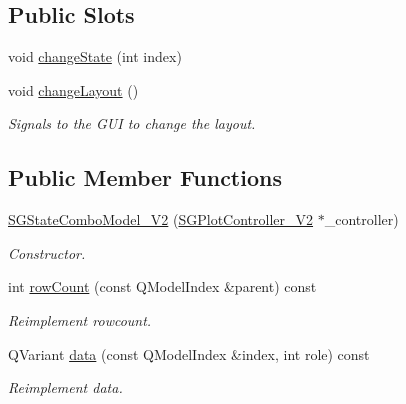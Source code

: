 \subsection*{Public Slots}
\begin{DoxyCompactItemize}
\item 
void \hyperlink{classSGStateComboModel__V2_a88d15de602377d88c1e1dfcc9f6e27e4}{change\+State} (int index)
\item 
\mbox{\label{classSGStateComboModel__V2_a97f746bffa0ab0a312b9e059a381b5e7}} 
void \hyperlink{classSGStateComboModel__V2_a97f746bffa0ab0a312b9e059a381b5e7}{change\+Layout} ()
\begin{DoxyCompactList}\small\item\em Signals to the G\+UI to change the layout. \end{DoxyCompactList}\end{DoxyCompactItemize}
\subsection*{Public Member Functions}
\begin{DoxyCompactItemize}
\item 
\mbox{\label{classSGStateComboModel__V2_acfa818f60e57aadfbed7d49d50fce33a}} 
\hyperlink{classSGStateComboModel__V2_acfa818f60e57aadfbed7d49d50fce33a}{S\+G\+State\+Combo\+Model\+\_\+\+V2} (\hyperlink{classSGPlotController__V2}{S\+G\+Plot\+Controller\+\_\+\+V2} $\ast$\+\_\+controller)
\begin{DoxyCompactList}\small\item\em Constructor. \end{DoxyCompactList}\item 
\mbox{\label{classSGStateComboModel__V2_ad5ae18ea1853430e14ad95f210a85c84}} 
int \hyperlink{classSGStateComboModel__V2_ad5ae18ea1853430e14ad95f210a85c84}{row\+Count} (const Q\+Model\+Index \&parent) const
\begin{DoxyCompactList}\small\item\em Reimplement rowcount. \end{DoxyCompactList}\item 
\mbox{\label{classSGStateComboModel__V2_a508efaadca65a3aad0d1b97f9c0cb398}} 
Q\+Variant \hyperlink{classSGStateComboModel__V2_a508efaadca65a3aad0d1b97f9c0cb398}{data} (const Q\+Model\+Index \&index, int role) const
\begin{DoxyCompactList}\small\item\em Reimplement data. \end{DoxyCompactList}\end{DoxyCompactItemize}

